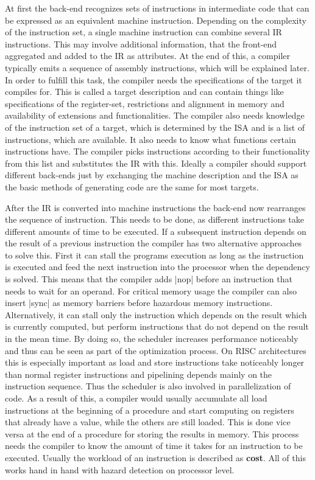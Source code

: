 {At first the back-end recognizes sets of instructions in intermediate code that can be expressed as an equivalent machine instruction.
Depending on the complexity of the instruction set, a single machine instruction can combine several \ac{IR} instructions.
This may involve additional information, that the front-end aggregated and added to the \ac{IR} as attributes.
At the end of this, a compiler typically emits a sequence of assembly instructions, which will be explained later.
In order to fulfill this task, the compiler needs the specifications of the target it compiles for.
This is called a target description and can contain things like specifications of the register-set, restrictions and alignment in memory and availability of extensions and functionalities.
The compiler also needs knowledge of the instruction set of a target, which is determined by the \ac{ISA} and is a list of instructions, which are available.
It also needs to know what functions certain instructions have.
The compiler picks instructions according to their functionality from this list and substitutes the \ac{IR} with this.
Ideally a compiler should support different back-ends just by exchanging the machine description and the \ac{ISA} as the basic methods of generating code are the same for most targets.

After the IR is converted into machine instructions the back-end now rearranges the sequence of instruction.
This needs to be done, as different instructions take different amounts of time to be executed.
If a subsequent instruction depends on the result of a previous instruction the compiler has two alternative approaches to solve this.
First it can stall the programs execution as long as the instruction is executed and feed the next instruction into the processor when the dependency is solved.
This means that the compiler adds |nop| before an instruction that needs to wait for an operand.
For critical memory usage the compiler can also insert |sync| as memory barriers before hazardous memory instructions.
Alternatively, it can stall only the instruction which depends on the result which is currently computed, but perform instructions that do not depend on the result in the mean time.
By doing so, the scheduler increases performance noticeably and thus can be seen as part of the optimization process.
On \ac{RISC} architectures this is especially important as load and store instructions take noticeably longer than normal register instructions and pipelining depends mainly on the instruction sequence.
Thus the scheduler is also involved in parallelization of code.
As a result of this, a compiler would usually accumulate all load instructions at the beginning of a procedure and start computing on registers that already have a value, while the others are still loaded.
This is done vice versa at the end of a procedure for storing the results in memory.
This process needs the compiler to know the amount of time it takes for an instruction to be executed.
Usually the workload of an instruction is described as \textbf{cost}.
All of this works hand in hand with hazard detection on processor level.

}
